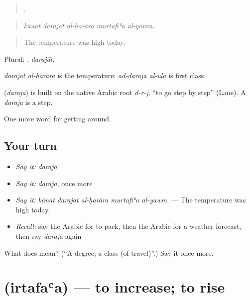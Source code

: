 \begin{quote}
    .
\end{quote}

\begin{quote}
\emph{kānat darajat al-ḥarāra murtafiʿa al-yawm.}
\end{quote}

\begin{quote}
The temperature was high today.
\end{quote}

Plural: , \emph{darajāt}.

\emph{darajat al-ḥarāra} is the temperature; \emph{ad-daraja al-ūlā} is first class.

\begin{cousinweb}
\textbf{} (\emph{daraja}) is built on the native Arabic root \emph{d-r-j}, \textquotedblleft{}to go step by step\textquotedblright{} (Lane). A \emph{daraja} is a step.
\end{cousinweb}

\begin{grammarlens}[title={What you've built}]
One more word for getting around.
\end{grammarlens}

\subsection*{Your turn}
\begin{itemize}
\raggedright
  \item \emph{Say it:} \emph{daraja}
  \item \emph{Say it:} \emph{daraja}, once more
  \item \emph{Say it:} \emph{kānat darajat al-ḥarāra murtafiʿa al-yawm.} — The temperature was high today.
  \item \emph{Recall:} say the Arabic for to pack, then the Arabic for a weather forecast, then say \emph{daraja} again
\end{itemize}

\begin{tcolorbox}[breakable,colback=teal!4,colframe=teal!35!black,title={Before you move on}]
What does  mean? (\textquotedblleft{}A degree; a class (of travel)\textquotedblright{}.) Say it once more.
\end{tcolorbox}
\section[\texorpdfstring{\ar{ارتفع} (irtafaʿa)}{ارتفع (irtafaʿa)}]{ (irtafaʿa) — to increase; to rise}

